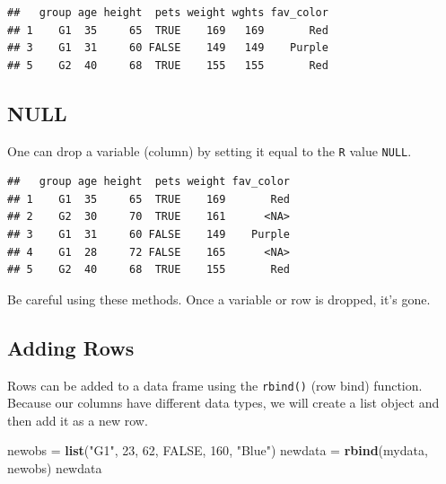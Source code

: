 \documentclass[
]{book}
\newenvironment{Shaded}{\begin{snugshade}}{\end{snugshade}}
\newcommand{\DecValTok}[1]{\textcolor[rgb]{0.00,0.00,0.81}{#1}}
\newcommand{\KeywordTok}[1]{\textcolor[rgb]{0.13,0.29,0.53}{\textbf{#1}}}
\newcommand{\NormalTok}[1]{#1}
\newcommand{\OperatorTok}[1]{\textcolor[rgb]{0.81,0.36,0.00}{\textbf{#1}}}
\newcommand{\OtherTok}[1]{\textcolor[rgb]{0.56,0.35,0.01}{#1}}
\newcommand{\StringTok}[1]{\textcolor[rgb]{0.31,0.60,0.02}{#1}}
\begin{document}
\begin{verbatim}
##   group age height  pets weight wghts fav_color
## 1    G1  35     65  TRUE    169   169       Red
## 3    G1  31     60 FALSE    149   149    Purple
## 5    G2  40     68  TRUE    155   155       Red
\end{verbatim}

\hypertarget{null}{%
\subsection*{NULL}\label{null}}

One can drop a variable (column) by setting it equal to the \texttt{R} value \texttt{NULL}.

\begin{Shaded}
\end{Shaded}

\begin{verbatim}
##   group age height  pets weight fav_color
## 1    G1  35     65  TRUE    169       Red
## 2    G2  30     70  TRUE    161      <NA>
## 3    G1  31     60 FALSE    149    Purple
## 4    G1  28     72 FALSE    165      <NA>
## 5    G2  40     68  TRUE    155       Red
\end{verbatim}

Be careful using these methods. Once a variable or row is dropped, it's gone.

\hypertarget{adding-rows}{%
\subsection*{Adding Rows}\label{adding-rows}}

Rows can be added to a data frame using the \texttt{rbind()} (row bind) function. Because our columns have different data types, we will create a list object and then add it as a new row.

\begin{Shaded}
\begin{Highlighting}[]
\NormalTok{newobs =}\StringTok{ }\KeywordTok{list}\NormalTok{(}\StringTok{"G1"}\NormalTok{, }\DecValTok{23}\NormalTok{, }\DecValTok{62}\NormalTok{, }\OtherTok{FALSE}\NormalTok{, }\DecValTok{160}\NormalTok{, }\StringTok{"Blue"}\NormalTok{)}
\NormalTok{newdata =}\StringTok{ }\KeywordTok{rbind}\NormalTok{(mydata, newobs)}
\NormalTok{newdata}
\end{Highlighting}
\end{Shaded}
\end{document}
